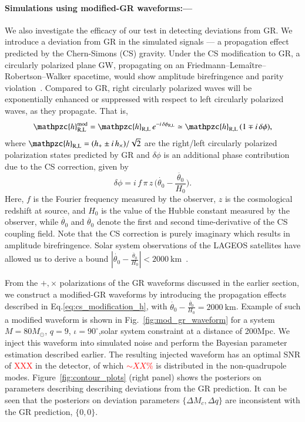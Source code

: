 \documentclass[prl,preprintnumbers,twocolumn,eqsecnum,floatfix,a4paper,nofootinbib,superscriptaddress]{revtex4}
\newcommand{\red}[1]{\textcolor{red}{#1}}
\newcommand{\h}{\mathpzc{h}}
\begin{document}
\paragraph{Simulations using modified-GR waveforms:---}

We also investigate the efficacy of our test in detecting deviations from GR. We introduce a deviation from GR in the simulated signals --- a propagation effect predicted by the Chern-Simons (CS) gravity. Under the CS modification to GR, a circularly polarized plane GW, propagating on an Friedmann–Lema\^itre–Robertson–Walker spacetime, would show amplitude birefringence and parity violation~\cite{Yunes:2010yf}. Compared to GR, right circularly polarized waves will be exponentially enhanced or suppressed with respect to left circularly polarized waves, as they propagate. That is, 
% 
\begin{equation}
\h_\mathrm{R,L}^\mathrm{mod} = \h_\mathrm{R,L} \, e^{-i \, \delta\phi_\mathrm{R,L}} \simeq  \h_\mathrm{R,L} \, (1 \mp i \, \delta\phi),
\label{eq:cs_modification_h}
\end{equation}
where $\h_\mathrm{R,L} = (h_+ \pm i \, h_\times)/\sqrt{2}$ are the right/left circularly polarized polarization states predicted by GR and $\delta \phi$ is an additional phase contribution due to the CS correction, given by 
\begin{equation}
\delta \phi = i \, f \, \pi \, z \, \Big(\dot{\theta_0}-\frac{\ddot{\theta_0}}{H_0}\Big).
\label{eq:cs_modification_dphi}
\end{equation}
Here, $f$ is the Fourier frequency measured by the observer, $z$ is the cosmological redshift at source, and ${H_0}$ is the value of the Hubble constant measured by the observer, while $\dot{\theta_0}$ and $\ddot{\theta_0}$ denote the first and second time-derivative of the CS coupling field. Note that the CS correction is purely imaginary which results in amplitude birefringence. Solar system observations of the LAGEOS satellites have allowed us to derive a bound $|\dot{\theta_0}-\frac{\ddot{\theta_0}}{H_0}| < 2000~\mathrm{km}$~\cite{Yunes:2010yf,Smith:2007jm}.

From the $+,\times$ polarizations of the GR waveforms discussed in the earlier section, we construct a modified-GR waveforms by introducing the propagation effects described in Eq.\eqref{eq:cs_modification_h}, with $\dot{\theta_0}-\frac{\ddot{\theta_0}}{H_0} = 2000~\mathrm{km}$. Example of such a modified waveform is shown in Fig.~\ref{fig:mod_gr_waveform} for a system $M = 80M_{\odot}$, $q =9$, $\iota = 90^{\circ}$,solar system constraint at a distance of 200Mpc. We inject this waveform into simulated noise and perform the Bayesian parameter estimation described earlier. The resulting injected waveform has an optimal SNR of \red{XXX} in the detector, of which \red{$\sim XX\%$} is distributed in the non-quadrupole modes. Figure~\ref{fig:contour_plots} (right panel) shows the posteriors on parameters describing describing deviations from the GR prediction. It can be seen that the posteriors on deviation parameters $\{\Delta M_c, \Delta q\}$ are inconsistent with the GR prediction, $\{0, 0\}$. 
\end{document}
